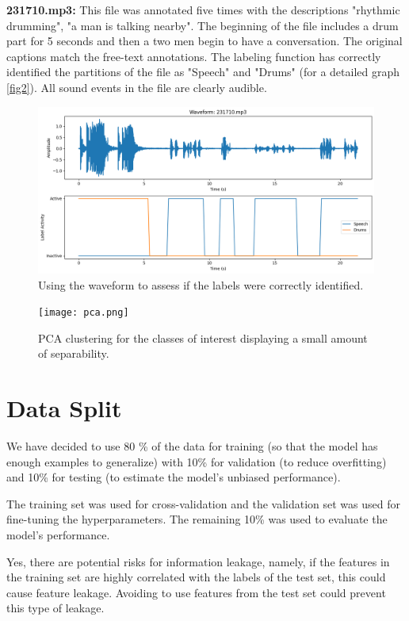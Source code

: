 \documentclass{article}
\begin{document}
\textbf{231710.mp3:}
This file was annotated five times with the descriptions "rhythmic drumming", "a man is talking nearby". The beginning of the file includes a drum part for 5 seconds and then a two men begin to have a conversation. The original captions match the free-text annotations. The labeling function has correctly identified the partitions of the file as "Speech" and "Drums" (for a detailed graph \autoref{fig2}). All sound events in the file are clearly audible.

\begin{figure}[H]
  \centering
  \includegraphics[width=0.75\linewidth]{output2.png}
  \caption{Using the waveform to assess if the labels were correctly identified.}
  \label{fig2}
\end{figure}

\begin{figure}[H]
  \centering
  \texttt{[image: pca.png]}
  \caption{PCA clustering for the classes of interest displaying a small amount of separability.}
  \label{fig3}
\end{figure}

\section{Data Split}
\label{sec:data_split}
We have decided to use 80 \% of the data for training (so that the model has enough examples to generalize) with 10\% for validation (to reduce overfitting) and 10\% for testing (to estimate the model's unbiased performance). 

The training set was used for cross-validation and the validation set was used for fine-tuning the hyperparameters. The remaining 10\% was used to evaluate the model's performance.

Yes, there are potential risks for information leakage, namely, if the features in the training set are highly correlated with the labels of the test set, this could cause feature leakage. Avoiding to use features from the test set could prevent this type of leakage. 
\end{document}

